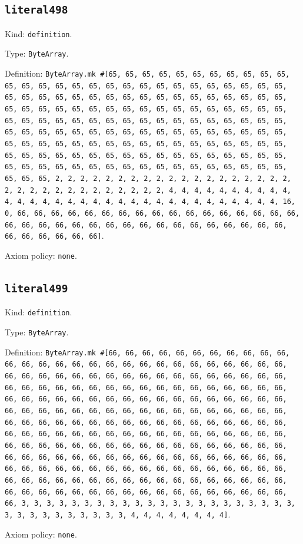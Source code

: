 \documentclass[11pt]{article}
\begin{document}
\subsection*{\texttt{literal498}}
\noindent Kind: \texttt{definition}.\par
\noindent Type: \texttt{ByteArray}.\par
\noindent Definition: \texttt{ByteArray.mk \#[65, 65, 65, 65, 65, 65, 65, 65, 65, 65, 65, 65, 65, 65, 65, 65, 65, 65, 65, 65, 65, 65, 65, 65, 65, 65, 65, 65, 65, 65, 65, 65, 65, 65, 65, 65, 65, 65, 65, 65, 65, 65, 65, 65, 65, 65, 65, 65, 65, 65, 65, 65, 65, 65, 65, 65, 65, 65, 65, 65, 65, 65, 65, 65, 65, 65, 65, 65, 65, 65, 65, 65, 65, 65, 65, 65, 65, 65, 65, 65, 65, 65, 65, 65, 65, 65, 65, 65, 65, 65, 65, 65, 65, 65, 65, 65, 65, 65, 65, 65, 65, 65, 65, 65, 65, 65, 65, 65, 65, 65, 65, 65, 65, 65, 65, 65, 65, 65, 65, 65, 65, 65, 65, 65, 65, 65, 65, 65, 65, 65, 65, 65, 65, 65, 65, 65, 65, 65, 65, 65, 65, 65, 65, 65, 65, 65, 65, 65, 65, 65, 2, 2, 2, 2, 2, 2, 2, 2, 2, 2, 2, 2, 2, 2, 2, 2, 2, 2, 2, 2, 2, 2, 2, 2, 2, 2, 2, 2, 2, 2, 2, 2, 4, 4, 4, 4, 4, 4, 4, 4, 4, 4, 4, 4, 4, 4, 4, 4, 4, 4, 4, 4, 4, 4, 4, 4, 4, 4, 4, 4, 4, 4, 4, 4, 16, 0, 66, 66, 66, 66, 66, 66, 66, 66, 66, 66, 66, 66, 66, 66, 66, 66, 66, 66, 66, 66, 66, 66, 66, 66, 66, 66, 66, 66, 66, 66, 66, 66, 66, 66, 66, 66, 66, 66, 66, 66]}.\par
\noindent Axiom policy: \texttt{none}.\par
\subsection*{\texttt{literal499}}
\noindent Kind: \texttt{definition}.\par
\noindent Type: \texttt{ByteArray}.\par
\noindent Definition: \texttt{ByteArray.mk \#[66, 66, 66, 66, 66, 66, 66, 66, 66, 66, 66, 66, 66, 66, 66, 66, 66, 66, 66, 66, 66, 66, 66, 66, 66, 66, 66, 66, 66, 66, 66, 66, 66, 66, 66, 66, 66, 66, 66, 66, 66, 66, 66, 66, 66, 66, 66, 66, 66, 66, 66, 66, 66, 66, 66, 66, 66, 66, 66, 66, 66, 66, 66, 66, 66, 66, 66, 66, 66, 66, 66, 66, 66, 66, 66, 66, 66, 66, 66, 66, 66, 66, 66, 66, 66, 66, 66, 66, 66, 66, 66, 66, 66, 66, 66, 66, 66, 66, 66, 66, 66, 66, 66, 66, 66, 66, 66, 66, 66, 66, 66, 66, 66, 66, 66, 66, 66, 66, 66, 66, 66, 66, 66, 66, 66, 66, 66, 66, 66, 66, 66, 66, 66, 66, 66, 66, 66, 66, 66, 66, 66, 66, 66, 66, 66, 66, 66, 66, 66, 66, 66, 66, 66, 66, 66, 66, 66, 66, 66, 66, 66, 66, 66, 66, 66, 66, 66, 66, 66, 66, 66, 66, 66, 66, 66, 66, 66, 66, 66, 66, 66, 66, 66, 66, 66, 66, 66, 66, 66, 66, 66, 66, 66, 66, 66, 66, 66, 66, 66, 66, 66, 66, 66, 66, 66, 66, 66, 66, 66, 66, 66, 66, 66, 66, 66, 66, 3, 3, 3, 3, 3, 3, 3, 3, 3, 3, 3, 3, 3, 3, 3, 3, 3, 3, 3, 3, 3, 3, 3, 3, 3, 3, 3, 3, 3, 3, 3, 3, 4, 4, 4, 4, 4, 4, 4, 4]}.\par
\noindent Axiom policy: \texttt{none}.\par
\end{document}
